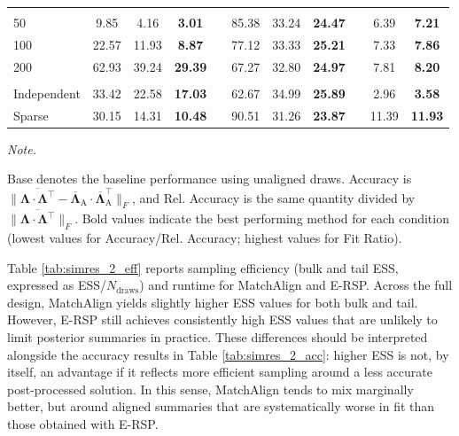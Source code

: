 \documentclass[
  man,
  longtable,
  nolmodern,
  notxfonts,
  notimes,
  colorlinks=true,linkcolor=blue,citecolor=blue,urlcolor=blue]{apa7}
\theoremstyle{plain}
\theoremstyle{plain}
\theoremstyle{remark}
\begin{document}
\begin{table}
\begin{threeparttable}
\begin{tabular}[t]{lcccccccccc}
\addlinespace[0.3em]
\multicolumn{11}{l}{\textbf{J}}\\
\hspace{1em}50 & 9.85 & 4.16 & \textbf{3.01} &  & 85.38 & 33.24 & \textbf{24.47} &  & 6.39 & \textbf{7.21}\\
\hspace{1em}100 & 22.57 & 11.93 & \textbf{8.87} &  & 77.12 & 33.33 & \textbf{25.21} &  & 7.33 & \textbf{7.86}\\
\hspace{1em}200 & 62.93 & 39.24 & \textbf{29.39} &  & 67.27 & 32.80 & \textbf{24.97} &  & 7.81 & \textbf{8.20}\\
\addlinespace[0.3em]
\multicolumn{11}{l}{\textbf{Lambda}}\\
\hspace{1em}Independent & 33.42 & 22.58 & \textbf{17.03} &  & 62.67 & 34.99 & \textbf{25.89} &  & 2.96 & \textbf{3.58}\\
\hspace{1em}Sparse & 30.15 & 14.31 & \textbf{10.48} &  & 90.51 & 31.26 & \textbf{23.87} &  & 11.39 & \textbf{11.93}\\
\bottomrule
\end{tabular}
\begin{tablenotes}
\item \textit{Note.} 
\item Base denotes the baseline performance using unaligned draws. Accuracy is $\|\overline{\mathbf\Lambda\cdot\mathbf\Lambda^\top} - \overline{\mathbf\Lambda}_{\text{A}}\cdot\overline{\mathbf\Lambda}_{\text{A}}^\top\|_{F}$, and Rel. Accuracy is the same quantity divided by $\|\overline{\mathbf\Lambda\cdot\mathbf\Lambda^\top}\|_F$. Bold values indicate the best performing method for each condition (lowest values for Accuracy/Rel. Accuracy; highest values for Fit Ratio).
\end{tablenotes}
\end{threeparttable}
\end{table}

Table \ref{tab:simres_2_eff} reports sampling efficiency (bulk and tail
ESS, expressed as ESS/\(N_\text{draws}\)) and runtime for MatchAlign and
E-RSP. Across the full design, MatchAlign yields slightly higher ESS
values for both bulk and tail. However, E-RSP still achieves
consistently high ESS values that are unlikely to limit posterior
summaries in practice. These differences should be interpreted alongside
the accuracy results in Table \ref{tab:simres_2_acc}: higher ESS is not,
by itself, an advantage if it reflects more efficient sampling around a
less accurate post-processed solution. In this sense, MatchAlign tends
to mix marginally better, but around aligned summaries that are
systematically worse in fit than those obtained with E-RSP.
\end{document}
